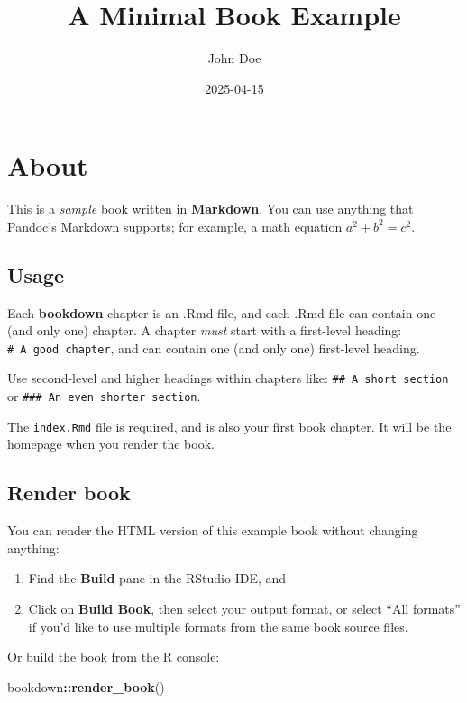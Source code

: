 \documentclass[
]{book}
\title{A Minimal Book Example}
\author{John Doe}
\date{2025-04-15}
\newenvironment{Shaded}{\begin{snugshade}}{\end{snugshade}}
\newcommand{\FunctionTok}[1]{\textcolor[rgb]{0.13,0.29,0.53}{\textbf{#1}}}
\newcommand{\NormalTok}[1]{#1}
\newcommand{\SpecialCharTok}[1]{\textcolor[rgb]{0.81,0.36,0.00}{\textbf{#1}}}
\theoremstyle{definition}
\theoremstyle{definition}
\theoremstyle{definition}
\theoremstyle{definition}
\theoremstyle{remark}
\begin{document}
\maketitle

{
\setcounter{tocdepth}{1}
\tableofcontents
}
\chapter{About}\label{about}

This is a \emph{sample} book written in \textbf{Markdown}. You can use anything that Pandoc's Markdown supports; for example, a math equation \(a^2 + b^2 = c^2\).

\section{Usage}\label{usage}

Each \textbf{bookdown} chapter is an .Rmd file, and each .Rmd file can contain one (and only one) chapter. A chapter \emph{must} start with a first-level heading: \texttt{\#\ A\ good\ chapter}, and can contain one (and only one) first-level heading.

Use second-level and higher headings within chapters like: \texttt{\#\#\ A\ short\ section} or \texttt{\#\#\#\ An\ even\ shorter\ section}.

The \texttt{index.Rmd} file is required, and is also your first book chapter. It will be the homepage when you render the book.

\section{Render book}\label{render-book}

You can render the HTML version of this example book without changing anything:

\begin{enumerate}
\def\labelenumi{\arabic{enumi}.}
\item
  Find the \textbf{Build} pane in the RStudio IDE, and
\item
  Click on \textbf{Build Book}, then select your output format, or select ``All formats'' if you'd like to use multiple formats from the same book source files.
\end{enumerate}

Or build the book from the R console:

\begin{Shaded}
\begin{Highlighting}[]
\NormalTok{bookdown}\SpecialCharTok{::}\FunctionTok{render\_book}\NormalTok{()}
\end{Highlighting}
\end{Shaded}
\end{document}
